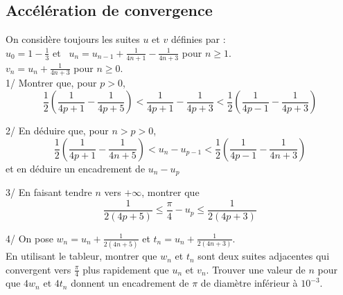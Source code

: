 \documentclass[a4paper,11pt]{book}
\begin{document}
\subsection{Acc\'el\'eration de convergence}
 On consid\`ere toujours les suites $u$ et $v$ d\'efinies par :\\
$\displaystyle u_0=1-\frac{1}{3}$ et \ $\displaystyle u_{n}=u_{n-1}+\frac{1}{4n+1}-\frac{1}{4n+3}$ pour $n \geq 1$.\\
$\displaystyle v_n=u_n+\frac{1}{4n+3}$ pour $n \geq 0$.\\
1/ Montrer que, pour $p>0$, $$\frac{1}{2}(\frac{1}{4p+1}-\frac{1}{4p+5})<\frac{1}{4p+1}-\frac{1}{4p+3}<\frac{1}{2}(\frac{1}{4p-1}-\frac{1}{4p+3})$$ 

2/ En d\'eduire que, pour $n>p>0$, $$\frac{1}{2}(\frac{1}{4p+1}-\frac{1}{4n+5})<u_n-u_{p-1}<\frac{1}{2}(\frac{1}{4p-1}-\frac{1}{4n+3})$$ et en d\'eduire un encadrement de $u_n-u_p$

3/ En faisant tendre $n$ vers $+\infty$, montrer que $$\frac{1}{2(4p+5)}\leq \frac{\pi}{4}-u_p\leq\frac{1}{2(4p+3)}$$

4/ On pose $\displaystyle w_n=u_n+\frac{1}{2(4n+5)}$ et 
$\displaystyle t_n=u_n+\frac{1}{2(4n+3)}$.\\
En utilisant le tableur, montrer que $w_n$ et $t_n$ sont deux suites adjacentes qui convergent vers $\displaystyle \frac{\pi}{4}$ plus rapidement que $u_n$ et $v_n$.
Trouver une valeur de $n$ pour que $4w_n$ et $4t_n$ donnent un encadrement de $\pi$ de diam\`etre inf\'erieur \`a $10^{-3}$.
\ \\
\end{document}
